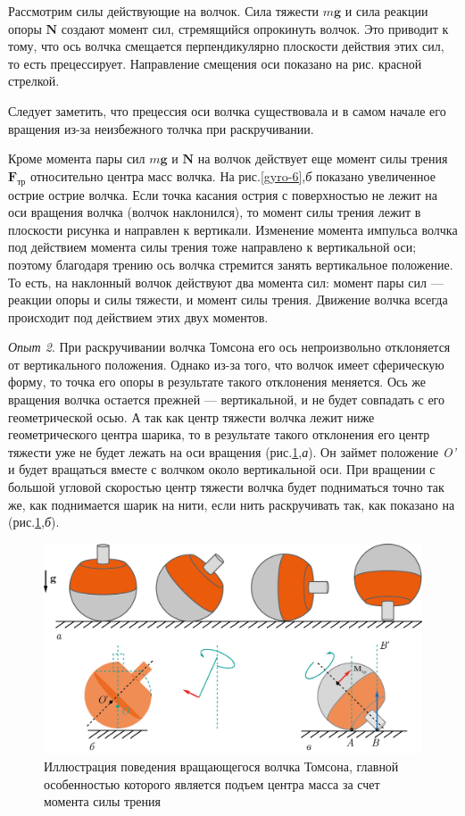 \documentclass[14pt,a4paper,oneside]{extarticle}	%
\begin{document}
			Рассмотрим силы действующие на волчок.
			Сила тяжести $ m\textbf{g} $ и сила реакции опоры $ \textbf{N} $ создают момент сил, стремящийся опрокинуть волчок. Это приводит к тому, что ось волчка смещается перпендикулярно плоскости действия этих сил, то есть прецессирует.
			Направление смещения оси показано на рис. красной стрелкой.
			
			Следует заметить, что прецессия оси волчка существовала и в самом начале его вращения из-за неизбежного толчка при раскручивании.
			
			Кроме момента пары сил  $ m\textbf{g} $ и $ \textbf{N} $  на волчок действует еще момент силы трения $ \textbf{F}_{\text{тр}} $ относительно центра масс волчка.
			На рис.\ref{gyro-6},\textit{б} показано увеличенное острие острие волчка. 
			Если точка касания острия с поверхностью не лежит на оси вращения волчка (волчок наклонился), то момент силы трения лежит в плоскости рисунка и направлен к вертикали. Изменение момента импульса волчка под действием момента силы трения тоже направлено к вертикальной оси; поэтому благодаря трению ось волчка стремится занять вертикальное положение. 	
			То есть, на наклонный волчок действуют два момента сил: момент пары сил — реакции опоры и силы тяжести, и момент силы трения. Движение волчка всегда происходит под действием этих двух моментов.
									
			\textit{Опыт 2}. При раскручивании волчка Томсона его ось непроизвольно отклоняется от вертикального положения.
			Однако из-за того, что волчок имеет сферическую форму, то точка его опоры в результате такого отклонения меняется.
			Ось же вращения волчка остается прежней — вертикальной, и не будет совпадать с его геометрической осью. 
			А так как центр тяжести волчка лежит ниже геометрического центра шарика, то в результате такого отклонения его центр тяжести уже не будет лежать на оси вращения (рис.\ref{gyro-7},\textit{а}).
			Он займет положение \textit{O'} и будет вращаться вместе с волчком около вертикальной оси.
			При вращении с большой угловой скоростью центр тяжести волчка будет подниматься точно так же, как поднимается шарик на нити, если нить раскручивать так, как показано на (рис.\ref{gyro-7},\textit{б}).	
				\begin{figure}[H] 	
					\centering 	
					\includegraphics[width=0.9\linewidth]{gyro-7.png}
					\caption{Иллюстрация поведения вращающегося волчка Томсона, главной особенностью которого является подъем центра масса за счет момента силы трения}
					\label{gyro-7}
				\end{figure}	
					
\end{document}
